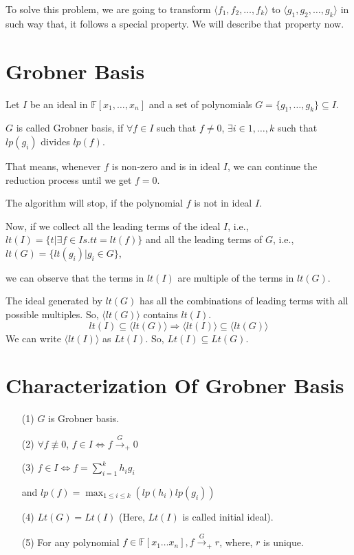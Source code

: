 To solve this problem, we are going to transform $\langle f_1,f_2, \ldots ,f_k \rangle$ to $\langle g_1,g_2, \ldots ,g_k \rangle$ in such way that, it follows a special property. We will describe that property now.

\section{Grobner Basis}
\begin{definition}
Let $I$ be an ideal in $\mathbb{F}[x_1, \ldots ,x_n]$
and a set of polynomials $G = \{g_1, \ldots ,g_k\} \subseteq I$.

$G$ is called Grobner basis, if $\forall f \in I$ such that $f \neq 0$, $\exists i \in {1, \ldots ,k}$ such that $lp(g_i)$ divides $ lp(f)$.

\end{definition}

That means, whenever $f$ is non-zero and is in ideal $I$, we can continue the reduction process until we get $f = 0$.

The algorithm will stop, if the polynomial $f$ is not in ideal $I$.

Now, if we collect all the leading terms of the ideal $I$, i.e., $lt(I) = \{ t | \exists f \in I s.t t = lt(f) \}$ and all the leading terms of $G$, i.e., $lt(G) = \{ lt(g_i) | g_i \in G \}$,

we can observe that the terms in $lt(I)$ are multiple of the terms in $lt(G)$.

\begin{observation}

The ideal generated by $lt(G)$ has all the combinations of leading terms with all possible multiples. So, $\langle lt(G) \rangle$ contains $lt(I)$.
$$ lt(I) \subseteq \langle lt(G) \rangle \Longrightarrow \langle lt(I) \rangle \subseteq \langle lt(G) \rangle$$
We can write $\langle lt(I) \rangle$ as $Lt(I)$. So, $Lt(I) \subseteq Lt(G)$.
\end{observation}

\section{Characterization Of Grobner Basis}
\begin{itemize}
\item[(1)] $G$ is Grobner basis.
\item[(2)] $ \forall f \not\equiv 0$, $ f \in I \Longleftrightarrow f {\mathop \rightarrow \limits^{G}}_{+} 0$
\item[(3)] $ f \in I \Longleftrightarrow f = \sum_{i =1}^{k} h_ig_i$ 

and $lp(f) = \max_{1 \le i \le k} ( lp(h_i)lp(g_i))$
\item[(4)] $Lt(G) = Lt(I)$ (Here, $Lt(I)$ is called initial ideal).
\item[(5)] For any polynomial $f \in \mathbb{F}[x_1 \ldots x_n], f {\mathop \rightarrow \limits^{G}}_{+} r$,  where, $r$ is unique.
\end{itemize}

